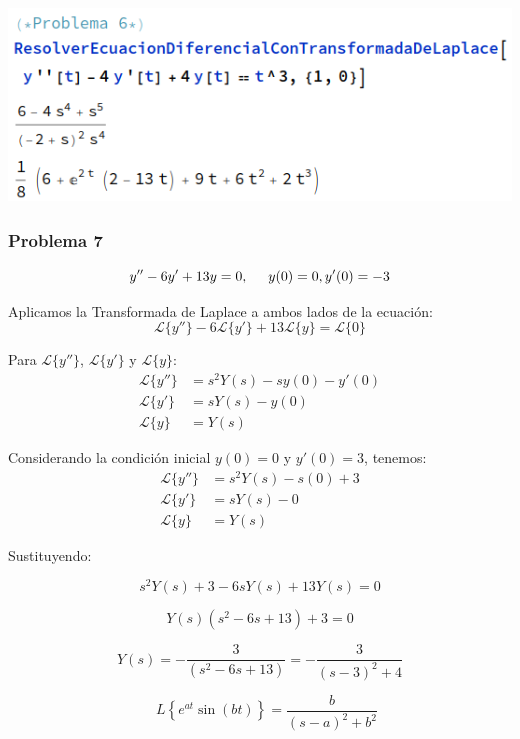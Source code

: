 \documentclass{article}
\begin{document}
\begin{center}
    \includegraphics[width=1\textwidth]{../ED 2/image7.png}
\end{center}


\newpage


\subsubsection{Problema 7}

\[y'' - 6y' + 13y = 0, \hspace{.5cm} y(0) = 0, y'(0) = -3\]

Aplicamos la Transformada de Laplace a ambos lados de la ecuación:
\[
    \mathcal{L}\{y''\} - 6\mathcal{L}\{y'\} + 13\mathcal{L}\{y\} = \mathcal{L}\{0\}
\]

Para \(\mathcal{L}\{y''\}\), \(\mathcal{L}\{y'\}\) y \(\mathcal{L}\{y\}\):
\begin{align*}
    \mathcal{L}\{y''\} & = s^2Y(s) - sy(0) - y'(0) \\
    \mathcal{L}\{y'\}  & = sY(s) - y(0)            \\
    \mathcal{L}\{y\}   & = Y(s)
\end{align*}

Considerando la condición inicial $y(0) = 0$ y $y'(0) = 3$, tenemos:
\begin{align*}
    \mathcal{L}\{y''\} & = s^2Y(s) - s(0) + 3 \\
    \mathcal{L}\{y'\}  & = sY(s) - 0          \\
    \mathcal{L}\{y\}   & = Y(s)
\end{align*}

Sustituyendo:

\[
    s^2Y(s) + 3 - 6sY(s) + 13Y(s) = 0
\]

\[
    Y(s)(s^2 - 6s + 13) + 3 = 0
\]

\[
    Y(s) = -\frac{3}{(s^2 - 6s + 13)} =  -\frac{3}{(s-3)^2+4}
\]

\[
    \quad L\left\{e^{at} \sin(bt)\right\} = \frac{b}{(s - a)^2 + b^2}
\]
\end{document}

